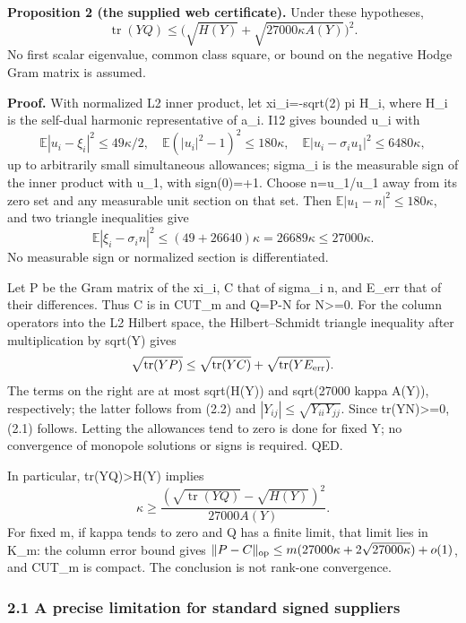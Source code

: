 \documentclass[
  10pt,
]{article}
\begin{document}
\textbf{Proposition 2 (the supplied web certificate).} Under these
hypotheses, \[
 \operatorname{tr}(YQ)\le
       \bigl(\sqrt{H(Y)}+\sqrt{27000\kappa A(Y)}\bigr)^2.   \tag{2.1}
\] No first scalar eigenvalue, common class square, or bound on the
negative Hodge Gram matrix is assumed.

\textbf{Proof.} With normalized L2 inner product, let xi\_i=-sqrt(2) pi
H\_i, where H\_i is the self-dual harmonic representative of a\_i. I12
gives bounded u\_i with \[
 \mathbb E|u_i-\xi_i|^2\le49\kappa/2,
 \quad\mathbb E(|u_i|^2-1)^2\le180\kappa,
 \quad\mathbb E|u_i-\sigma_i u_1|^2\le6480\kappa,
\] up to arbitrarily small simultaneous allowances; sigma\_i is the
measurable sign of the inner product with u\_1, with sign(0)=+1. Choose
n=u\_1/\textbar u\_1\textbar{} away from its zero set and any measurable
unit section on that set. Then \(\mathbb E|u_1-n|^2\le180\kappa\), and
two triangle inequalities give \[
 \mathbb E|\xi_i-\sigma_i n|^2
       \le (49+26640)\kappa=26689\kappa\le27000\kappa.    \tag{2.2}
\] No measurable sign or normalized section is differentiated.

Let P be the Gram matrix of the xi\_i, C that of sigma\_i n, and E\_err
that of their differences. Thus C is in CUT\_m and Q=P-N for
N\textgreater=0. For the column operators into the L2 Hilbert space, the
Hilbert--Schmidt triangle inequality after multiplication by sqrt(Y)
gives \[
 \sqrt{\operatorname{tr}(YP)}\le\sqrt{\operatorname{tr}(YC)}
                                      +\sqrt{\operatorname{tr}(YE_{\rm err})}.
\] The terms on the right are at most sqrt(H(Y)) and sqrt(27000 kappa
A(Y)), respectively; the latter follows from (2.2) and
\(|Y_{ij}|\le\sqrt{Y_{ii}Y_{jj}}\). Since tr(YN)\textgreater=0, (2.1)
follows. Letting the allowances tend to zero is done for fixed Y; no
convergence of monopole solutions or signs is required. QED.

In particular, tr(YQ)\textgreater H(Y) implies \[
 \kappa\ge
 \frac{(\sqrt{\operatorname{tr}(YQ)}-\sqrt{H(Y)})^2}{27000A(Y)}. \tag{2.3}
\] For fixed m, if kappa tends to zero and Q has a finite limit, that
limit lies in K\_m: the column error bound gives
\(\|P-C\|_{\rm op}\le m(27000\kappa+2\sqrt{27000\kappa})+o(1)\), and
CUT\_m is compact. The conclusion is not rank-one convergence.

\hypertarget{a-precise-limitation-for-standard-signed-suppliers}{%
\subsubsection{2.1 A precise limitation for standard signed
suppliers}\label{a-precise-limitation-for-standard-signed-suppliers}}
\end{document}
